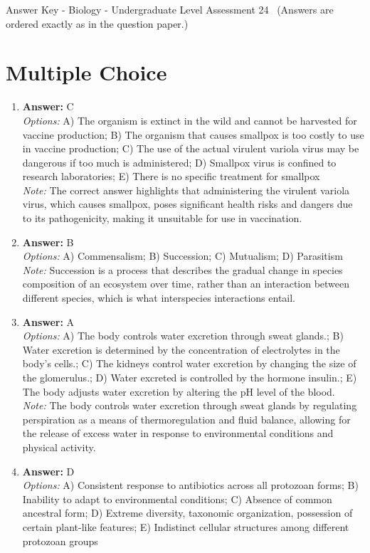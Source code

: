 \documentclass[12pt]{article}
\begin{document}
\begin{center}
Answer Key - Biology - Undergraduate Level Assessment 24 \
\small (Answers are ordered exactly as in the question paper.)
\end{center}

\section*{Multiple Choice}
\begin{enumerate}[label=\arabic*.]
\item \textbf{Answer:} C
\\ \textit{Options:} A) The organism is extinct in the wild and cannot be harvested for vaccine production; B) The organism that causes smallpox is too costly to use in vaccine production; C) The use of the actual virulent variola virus may be dangerous if too much is administered; D) Smallpox virus is confined to research laboratories; E) There is no specific treatment for smallpox
\\ \textit{Note:} The correct answer highlights that administering the virulent variola virus, which causes smallpox, poses significant health risks and dangers due to its pathogenicity, making it unsuitable for use in vaccination.
\item \textbf{Answer:} B
\\ \textit{Options:} A) Commensalism; B) Succession; C) Mutualism; D) Parasitism
\\ \textit{Note:} Succession is a process that describes the gradual change in species composition of an ecosystem over time, rather than an interaction between different species, which is what interspecies interactions entail.
\item \textbf{Answer:} A
\\ \textit{Options:} A) The body controls water excretion through sweat glands.; B) Water excretion is determined by the concentration of electrolytes in the body's cells.; C) The kidneys control water excretion by changing the size of the glomerulus.; D) Water excreted is controlled by the hormone insulin.; E) The body adjusts water excretion by altering the pH level of the blood.
\\ \textit{Note:} The body controls water excretion through sweat glands by regulating perspiration as a means of thermoregulation and fluid balance, allowing for the release of excess water in response to environmental conditions and physical activity.
\item \textbf{Answer:} D
\\ \textit{Options:} A) Consistent response to antibiotics across all protozoan forms; B) Inability to adapt to environmental conditions; C) Absence of common ancestral form; D) Extreme diversity, taxonomic organization, possession of certain plant-like features; E) Indistinct cellular structures among different protozoan groups

\end{enumerate}
\end{document}
